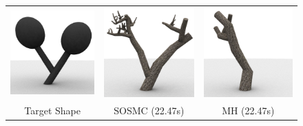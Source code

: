 \documentclass[
10pt, %
a4paper, %
oneside, %
headinclude,footinclude, %
BCOR5mm, %
]{scrartcl}
\newcommand*{\helvetica}{\fontfamily{phv}\selectfont}
\begin{document}
\vspace{1em}
\begin{figure}[h!]
	\centering
	\begin{tabular}{ccc}
		\includegraphics[width=0.30\linewidth]{figs/sosmc/target.png} &
		\includegraphics[width=0.30\linewidth]{figs/sosmc/sosmc.png} &
		\includegraphics[width=0.30\linewidth]{figs/sosmc/mh.png} \\
		{\helvetica \scriptsize{Target Shape}} & {\helvetica \scriptsize{SOSMC (22.47s)}} & {\helvetica \scriptsize{MH (22.47s)}}
	\end{tabular}
\end{figure}





\end{document}
